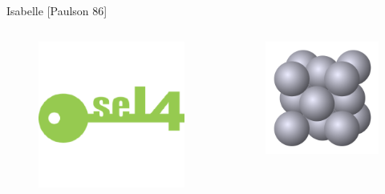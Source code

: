 \documentclass[17pt,aspectratio=169]{beamer}
\begin{document}
\begin{frame}{Isabelle {\small [Paulson 86]}}
    \vspace{-10pt}
    \begin{columns}
        \begin{column}{0.25\textwidth}
            \vspace{-7pt}
            \begin{figure}
                \includegraphics[width=0.9\linewidth]{./images/sel4-logo.png}
            \end{figure}
        \end{column}
        \begin{column}{0.33\textwidth}
            \vspace{-8pt}
            \begin{figure}
                \includegraphics[width=0.6\linewidth]{./images/kepler2.png} %

\end{figure}
\end{column}
\end{columns}
\end{frame}
\end{document}
